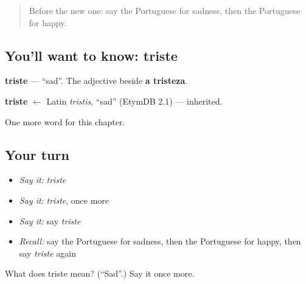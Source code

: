 \label{lesson:PT-C36-triste}



\begin{quote}
Before the new one: say the Portuguese for sadness, then the Portuguese for happy.
\end{quote}

\subsection*{You'll want to know: triste}
\textbf{triste} — \textquotedblleft{}sad\textquotedblright{}. The adjective beside \textbf{a tristeza}.

\begin{cousinweb}
\textbf{triste} $\leftarrow$ Latin \emph{tristis}, \textquotedblleft{}sad\textquotedblright{} (EtymDB 2.1) — inherited.
\end{cousinweb}

\begin{grammarlens}[title={What you've built}]
One more word for this chapter.
\end{grammarlens}

\subsection*{Your turn}
\begin{itemize}
\raggedright
  \item \emph{Say it:} \emph{triste}
  \item \emph{Say it:} \emph{triste}, once more
  \item \emph{Say it:} say \emph{triste}
  \item \emph{Recall:} say the Portuguese for sadness, then the Portuguese for happy, then say \emph{triste} again
\end{itemize}

\begin{tcolorbox}[breakable,colback=teal!4,colframe=teal!35!black,title={Before you move on}]
What does triste mean? (\textquotedblleft{}Sad\textquotedblright{}.) Say it once more.
\end{tcolorbox}
